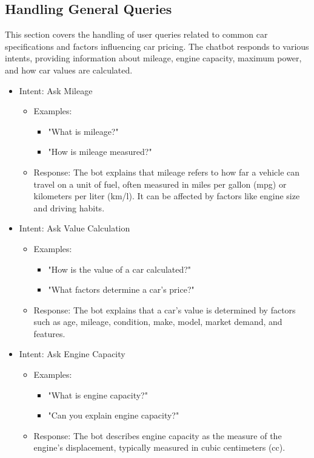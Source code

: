 \documentclass[a4paper,12pt]{article}
\begin{document}
\subsection{Handling General Queries}

This section covers the handling of user queries related to common car specifications and factors influencing car pricing. The chatbot responds to various intents, providing information about mileage, engine capacity, maximum power, and how car values are calculated.

\begin{itemize}
	\item Intent: Ask Mileage
	\begin{itemize}
		\item Examples: 
		\begin{itemize}
			\item "What is mileage?"
			\item "How is mileage measured?"
		\end{itemize}
		\item Response: The bot explains that mileage refers to how far a vehicle can travel on a unit of fuel, often measured in miles per gallon (mpg) or kilometers per liter (km/l). It can be affected by factors like engine size and driving habits.
	\end{itemize}
	
	\item Intent: Ask Value Calculation
	\begin{itemize}
		\item Examples:
		\begin{itemize}
			\item "How is the value of a car calculated?"
			\item "What factors determine a car's price?"
		\end{itemize}
		\item Response: The bot explains that a car's value is determined by factors such as age, mileage, condition, make, model, market demand, and features.
	\end{itemize}
	
	\item Intent: Ask Engine Capacity
	\begin{itemize}
		\item Examples:
		\begin{itemize}
			\item "What is engine capacity?"
			\item "Can you explain engine capacity?"
		\end{itemize}
		\item Response: The bot describes engine capacity as the measure of the engine's displacement, typically measured in cubic centimeters (cc).
	\end{itemize}
	

\end{itemize}
\end{document}
